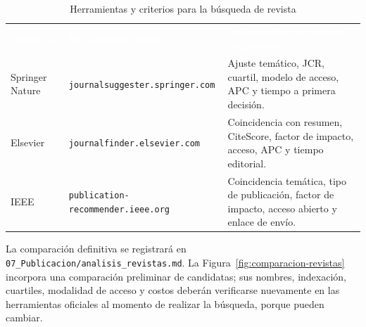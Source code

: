 \documentclass[12pt,a4paper]{article}
\begin{document}
\begin{table}[H]
\centering
\caption{Herramientas y criterios para la búsqueda de revista}
\label{tab:herramientas-revista}
\small
{}
\begin{tabularx}{\textwidth}{L{3.0cm} L{4.25cm} Y}
\textcolor{white}{\textbf{Editorial}} &
\textcolor{white}{\textbf{Herramienta oficial}} &
\textcolor{white}{\textbf{Información que deberá registrarse}}\\
Springer Nature & \nolinkurl{journalsuggester.springer.com} & Ajuste temático, JCR, cuartil, modelo de acceso, APC y tiempo a primera decisión.\\
Elsevier & \nolinkurl{journalfinder.elsevier.com} & Coincidencia con resumen, CiteScore, factor de impacto, acceso, APC y tiempo editorial.\\
IEEE & \nolinkurl{publication-recommender.ieee.org} & Coincidencia temática, tipo de publicación, factor de impacto, acceso abierto y enlace de envío.\\
\end{tabularx}
\end{table}

La comparación definitiva se registrará en \nolinkurl{07_Publicacion/analisis_revistas.md}. La Figura~\ref{fig:comparacion-revistas} incorpora una comparación preliminar de candidatas; sus nombres, indexación, cuartiles, modalidad de acceso y costos deberán verificarse nuevamente en las herramientas oficiales al momento de realizar la búsqueda, porque pueden cambiar.
\end{document}
